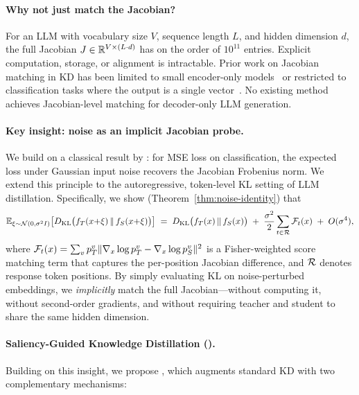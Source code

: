\paragraph{Why not just match the Jacobian?}
For an LLM with vocabulary size $V$, sequence length $L$, and hidden dimension $d$, the full Jacobian $J \in \mathbb{R}^{V \times (L \cdot d)}$ has on the order of $10^{11}$ entries.
Explicit computation, storage, or alignment is intractable.
Prior work on Jacobian matching in KD has been limited to small encoder-only models~\citep{srinivas2018knowledge, wang2022gkd} or restricted to classification tasks where the output is a single vector~\citep{wu-etal-2023-ad}.
No existing method achieves Jacobian-level matching for decoder-only LLM generation.

\paragraph{Key insight: noise as an implicit Jacobian probe.}
We build on a classical result by \citet{srinivas2018knowledge}: for MSE loss on classification, the expected loss under Gaussian input noise recovers the Jacobian Frobenius norm.
We extend this principle to the autoregressive, token-level KL setting of LLM distillation.
Specifically, we show (Theorem~\ref{thm:noise-identity}) that
\begin{equation}
  \mathbb{E}_{\xi \sim \mathcal{N}(0, \sigma^2 I)}\bigl[D_{\mathrm{KL}}\bigl(f_T(x{+}\xi) \,\|\, f_S(x{+}\xi)\bigr)\bigr]
  \;=\;
  D_{\mathrm{KL}}\bigl(f_T(x) \,\|\, f_S(x)\bigr)
  \;+\; \frac{\sigma^2}{2} \sum_{t \in \mathcal{R}} \mathcal{F}_t(x)
  \;+\; O(\sigma^4),
  \label{eq:noise-identity-intro}
\end{equation}
where $\mathcal{F}_t(x) = \sum_v p_T^v \|\nabla_x \log p_T^v - \nabla_x \log p_S^v\|^2$ is a Fisher-weighted score matching term that captures the per-position Jacobian difference, and $\mathcal{R}$ denotes response token positions.
By simply evaluating KL on noise-perturbed embeddings, we \emph{implicitly} match the full Jacobian---without computing it, without second-order gradients, and without requiring teacher and student to share the same hidden dimension.

\paragraph{Saliency-Guided Knowledge Distillation (\sagd{}).}
Building on this insight, we propose \sagd{}, which augments standard KD with two complementary mechanisms:

